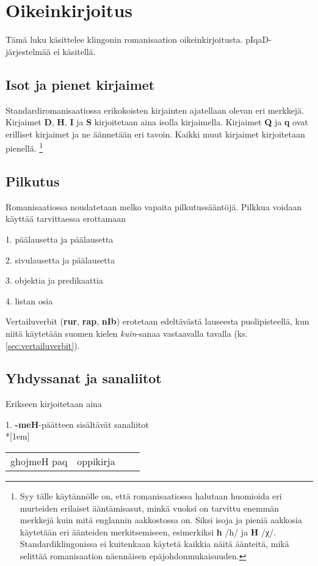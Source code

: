 \documentclass{book}
\begin{document}
\chapter{Oikeinkirjoitus}

Tämä luku käsittelee klingonin romanisaation oikeinkirjoitusta.
pIqaD-järjestelmää ei käsitellä.

\section{Isot ja pienet kirjaimet}

Standardiromanisaatiossa erikokoisten kirjainten ajatellaan olevan eri merkkejä.
Kirjaimet \textbf{D}, \textbf{H}, \textbf{I} ja \textbf{S} kirjoitetaan aina isolla kirjaimella.
Kirjaimet \textbf{Q} ja \textbf{q} ovat erilliset kirjaimet ja ne äännetään eri tavoin.
Kaikki muut kirjaimet kirjoitetaan pienellä.
\footnote{
    Syy tälle käytännölle on, että romanisaatiossa halutaan huomioida eri murteiden erilaiset ääntämisasut, minkä vuoksi on tarvittu enemmän merkkejä kuin mitä englannin aakkostossa on.
    Siksi isoja ja pieniä aakkosia käytetään eri äänteiden merkitsemiseen, esimerkiksi \textbf{h} /h/ ja \textbf{H} /χ/.
    Standardiklingonissa ei kuitenkaan käytetä kaikkia näitä äänteitä, mikä selittää romanisaation näennäisen epäjohdonmukaisuuden.
}

\section{Pilkutus}

Romanisaatiossa noudatetaan melko vapaita pilkutussääntöjä.
Pilkkua voidaan käyttää tarvittaessa erottamaan

1. päälausetta ja päälausetta

2. sivulausetta ja päälausetta

3. objektia ja predikaattia

4. listan osia

Vertailuverbit (\textbf{rur}, \textbf{rap}, \textbf{nIb}) erotetaan edeltävästä lauseesta puolipisteellä, kun niitä käytetään suomen kielen \textit{kuin}-sanaa vastaavalla tavalla (ks. \ref{sec:vertailuverbit}).

\section{Yhdyssanat ja sanaliitot}

Erikseen kirjoitetaan aina

1. \textbf{-meH}-päätteen sisältävät sanaliitot\\*[1em]
\begin{tabular}{Bl Il}
    ghojmeH paq & oppikirja \\
\end{tabular}
\end{document}
